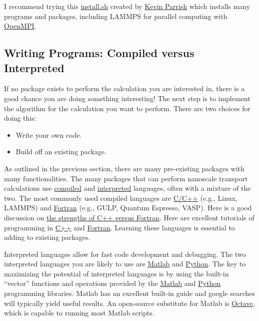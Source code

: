 I recommend trying this 
\href{https://gist.github.com/kparrish/6064159}{install.sh} created by 
\href{http://www.github.com/kparrish}{Kevin Parrish} which installs 
many programs and packages, including LAMMPS for parallel computing 
with 
\href{http://www.open-mpi.org/}{OpenMPI}.

\subsection{\label{A:Comp_Env:Writing}Writing Programs: 
Compiled versus Interpreted}

If no package exists to perform the calculation you are interested in, 
there is a good chance you are doing something interesting! The next 
step is to implement the algorithm for the calculation you want 
to perform. There are two choices for doing this: 
\begin{itemize}
\item Write your own code. 
\item Build off an existing package. 
\end{itemize}

As outlined in the previous 
section, there are many pre-existing packages with many functionalities. 
The many packages that can perform nanoscale transport calculations use 
\href{http://en.wikipedia.org/wiki/Compiled_language}{compiled} and 
\href{http://en.wikipedia.org/wiki/Interpreted_language}{interpreted}  
languages, often with a mixture of the two. 
The most commonly used compiled languages are 
\href{https://en.wikipedia.org/wiki/C\%2B\%2B}{C/C++} 
(e.g., Linux, LAMMPS) 
and 
\href{http://en.wikipedia.org/wiki/Fortran}{Fortran}
(e.g., GULP, Quantum Espresso, VASP). 
Here is a good discussion on 
\href{http://stackoverflow.com/questions/13078736/fortran-vs-c-does-fortran-still-hold-any-advantage-in-numerical-analysis-thes}
{the strengths of C++ versus Fortran}. Here are excellent tutorials 
of programming in  
\href{http://www.youtube.com/watch?v=XFQ9dw3CyDo&list=PL1D10C030FDCE7CE0}
{C++}
and 
\href{http://www.youtube.com/watch?v=YRTEOFMUTzw&list=PL6A8E21D2E86A0155}
{Fortran}. Learning these languages is essential to adding to existing 
packages. 

Interpreted languages allow for fast code development and debugging. 
The two interpreted languages you are likely to use are 
\href{http://en.wikipedia.org/wiki/MATLAB}{Matlab}  
and 
\href{http://en.wikipedia.org/wiki/Python_(programming_language)}{Python}. 
The key to maximizing the potential of interpreted languages is by 
using the built-in ``vector'' functions and operations provided by the 
\href{http://www.mathworks.com/help/matlab/matlab_prog/vectorization.html}
{Matlab}  
and 
\href{http://faculty.washington.edu/rjl/uwamath583s11/sphinx/notes/html/python_vect.html}
{Python}  
programming libraries. 
Matlab has an excellent built-in guide and google searches will typically 
yield useful results. An open-source substitute for Matlab is 
\href{http://www.gnu.org/software/octave/}
{Octave}, which is capable to running most Matlab scripts.

